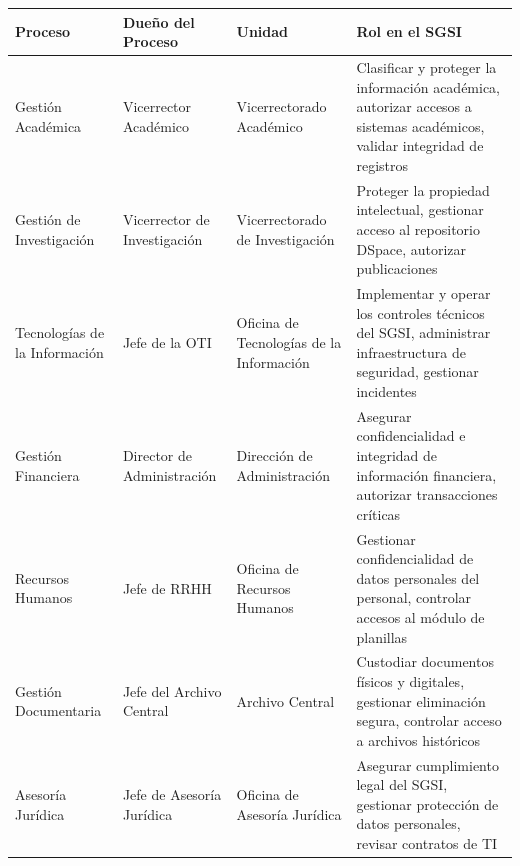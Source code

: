 \documentclass[10pt,letterpaper]{article}
\begin{document}
{\setlength{\RaggedRightRightskip}{0pt plus 5em}\small\sloppy \begin{longtable}[]{@{}
  >{\hspace{0pt}\RaggedRight\arraybackslash}p{}
  >{\hspace{0pt}\RaggedRight\arraybackslash}p{}
  >{\hspace{0pt}\RaggedRight\arraybackslash}p{}
  >{\hspace{0pt}\RaggedRight\arraybackslash}p{}@{}}
\toprule\noalign{}
\begin{minipage}[b]{\linewidth}\raggedright
Proceso
\end{minipage} & \begin{minipage}[b]{\linewidth}\raggedright
Dueño del Proceso
\end{minipage} & \begin{minipage}[b]{\linewidth}\raggedright
Unidad
\end{minipage} & \begin{minipage}[b]{\linewidth}\raggedright
Rol en el SGSI
\end{minipage} \\
\midrule\noalign{}
\endhead
\bottomrule\noalign{}
\endlastfoot
Gestión Académica & Vicerrector Académico & Vicerrectorado Académico &
Clasificar y proteger la información académica, autorizar accesos a
sistemas académicos, validar integridad de registros \\
Gestión de Investigación & Vicerrector de Investigación & Vicerrectorado
de Investigación & Proteger la propiedad intelectual, gestionar acceso
al repositorio DSpace, autorizar publicaciones \\
Tecnologías de la Información & Jefe de la OTI & Oficina de Tecnologías
de la Información & Implementar y operar los controles técnicos del
SGSI, administrar infraestructura de seguridad, gestionar incidentes \\
Gestión Financiera & Director de Administración & Dirección de
Administración & Asegurar confidencialidad e integridad de información
financiera, autorizar transacciones críticas \\
Recursos Humanos & Jefe de RRHH & Oficina de Recursos Humanos &
Gestionar confidencialidad de datos personales del personal, controlar
accesos al módulo de planillas \\
Gestión Documentaria & Jefe del Archivo Central & Archivo Central &
Custodiar documentos físicos y digitales, gestionar eliminación segura,
controlar acceso a archivos históricos \\
Asesoría Jurídica & Jefe de Asesoría Jurídica & Oficina de Asesoría
Jurídica & Asegurar cumplimiento legal del SGSI, gestionar protección de
datos personales, revisar contratos de TI \\
\end{longtable}\normalsize}
\end{document}
